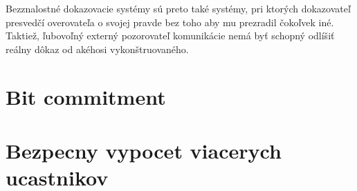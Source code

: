 Bezznalostné dokazovacie systémy sú preto také systémy, pri ktorých
dokazovateľ presvedčí overovateľa o svojej pravde bez toho aby mu
prezradil čokoľvek iné. Taktiež, ľubovoľný externý pozorovateľ
komunikácie nemá byť schopný odlíšiť reálny dôkaz od akéhosi
vykonštruovaného.



\section{Bit commitment}



\section{Bezpecny vypocet viacerych ucastnikov}

